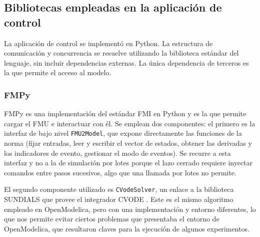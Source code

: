 

\subsection{Bibliotecas empleadas en la aplicación de control}

La aplicación de control se implementó en Python. La estructura de comunicación y concurrencia se resuelve utilizando la biblioteca estándar del lenguaje, sin incluir dependencias externas. La única dependencia de terceros es la que permite el acceso al modelo.

\subsubsection{FMPy}

FMPy es una implementación del estándar FMI en Python \cite{fmpy} y es la que permite cargar el FMU e interactuar con él. Se emplean dos componentes: el primero es la interfaz de bajo nivel \verb|FMU2Model|, que expone directamente las funciones de la norma (fijar entradas, leer y escribir el vector de estados, obtener las derivadas y los indicadores de evento, gestionar el modo de eventos). Se recurre a esta interfaz y no a la de simulación por lotes porque el lazo cerrado requiere inyectar comandos entre pasos sucesivos, algo que una llamada por lotes no permite.

El segundo componente utilizado es \verb|CVodeSolver|, un enlace a la biblioteca SUNDIALS \cite{hindmarsh2005} que provee el integrador CVODE \cite{cohen1995}. Este es el mismo algoritmo empleado en OpenModelica, pero con una implementación y entorno diferentes, lo que nos permite evitar ciertos problemas que presentaba el entorno de OpenModelica, que resultaron claves para la ejecución de algunos experimentos.

